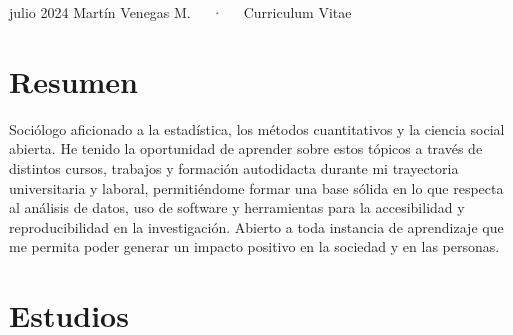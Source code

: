 \documentclass[11pt,a4paper,]{awesome-cv}
\begin{document}
\makecvheader

\makecvfooter
  {julio 2024}
    {Martín Venegas M.~~~·~~~Curriculum Vitae}
  {\thepage}





\hypertarget{resumen}{%
\section{Resumen}\label{resumen}}

Sociólogo aficionado a la estadística, los métodos cuantitativos y la
ciencia social abierta. He tenido la oportunidad de aprender sobre estos
tópicos a través de distintos cursos, trabajos y formación autodidacta
durante mi trayectoria universitaria y laboral, permitiéndome formar una
base sólida en lo que respecta al análisis de datos, uso de software y
herramientas para la accesibilidad y reproducibilidad en la
investigación. Abierto a toda instancia de aprendizaje que me permita
poder generar un impacto positivo en la sociedad y en las personas.

\hypertarget{estudios}{%
\section{Estudios}\label{estudios}}

\begin{cventries}
    \vspace{-4.0mm}
    \vspace{-4.0mm}
    \vspace{-4.0mm}
\end{cventries}
\end{document}
